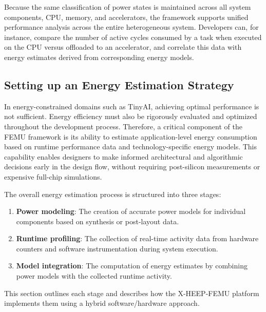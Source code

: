                 Because the same classification of power states is maintained across all system components, CPU, memory, and accelerators, the framework supports unified performance analysis across the entire heterogeneous system. Developers can, for instance, compare the number of active cycles consumed by a task when executed on the CPU versus offloaded to an accelerator, and correlate this data with energy estimates derived from corresponding energy models.

        \subsection{Setting up an Energy Estimation Strategy}
        
            In energy-constrained domains such as TinyAI, achieving optimal performance is not sufficient. Energy efficiency must also be rigorously evaluated and optimized throughout the development process. Therefore, a critical component of the \mbox{FEMU} framework is its ability to estimate application-level energy consumption based on runtime performance data and technology-specific energy models. This capability enables designers to make informed architectural and algorithmic decisions early in the design flow, without requiring post-silicon measurements or expensive full-chip simulations.
            
            The overall energy estimation process is structured into three stages:

            \vspace{-1em}
            \begin{enumerate}
                \item \textbf{Power modeling}: The creation of accurate power models for individual components based on synthesis or post-layout data.
                \item \textbf{Runtime profiling}: The collection of real-time activity data from hardware counters and software instrumentation during system execution.
                \item \textbf{Model integration}: The computation of energy estimates by combining power models with the collected runtime activity.
            \end{enumerate}
            \vspace{-1em}
            
            This section outlines each stage and describes how the \mbox{X-HEEP-FEMU} platform implements them using a hybrid software/hardware approach.

